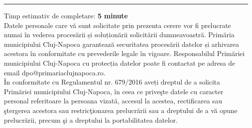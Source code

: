 \documentclass[11pt,a4paper]{article}
\begin{document}
\vspace{0.2cm}
\hrule
\vspace{0.2cm}
\footnotesize
Timp estimativ de completare: \textbf{5 minute}\\
Datele personale care vă sunt solicitate prin prezenta cerere vor fi prelucrate numai în vederea procesării și soluționării solicitării dumneavoastră. Primăria municipiului Cluj-Napoca garantează securitatea procesării datelor și arhivarea acestora în conformitate cu prevederile legale în vigoare. Responsabilul Primăriei municipiului Cluj-Napoca cu protecția datelor poate fi contactat pe adresa de email dpo@primariaclujnapoca.ro.\\
În conformitate cu Regulamentul nr. 679/2016 aveți dreptul de a solicita Primăriei municipiului Cluj-Napoca, în ceea ce priveşte datele cu caracter personal referitoare la persoana vizată, accesul la acestea, rectificarea sau ştergerea acestora sau restricţionarea prelucrării sau a dreptului de a vă opune prelucrării, precum şi a dreptului la portabilitatea datelor.
\end{document}
